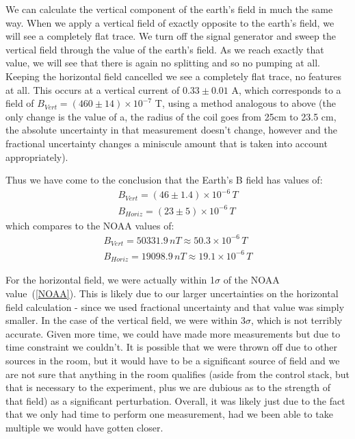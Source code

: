 \documentclass{article}
\begin{document}
    We can calculate the vertical component of the earth's field in much the same way.  When we apply a vertical field of exactly opposite to the earth's field, we will see a completely flat trace.  We turn off the signal generator and sweep the vertical field through the value of the earth's field.  As we reach exactly that value, we will see that there is again no splitting and so no pumping at all.  Keeping the horizontal field cancelled we see a completely flat trace, no features at all.  This occurs at a vertical current of $0.33 \pm 0.01$ A, which corresponds to a field of $B_{Vert} = (460 \pm 14) \times 10^{-7}$ T, using a method analogous to above (the only change is the value of a, the radius of the coil goes from 25cm to 23.5 cm, the absolute uncertainty in that measurement doesn't change, however and the fractional uncertainty changes a miniscule amount that is taken into account appropriately).

    \hspace{.25cm}

    Thus we have come to the conclusion that the Earth's B field has values of:
    \begin{gather*}
      B_{Vert} = (46 \pm 1.4) \times 10^{-6} \, T \\
      B_{Horiz} = (23 \pm 5) \times 10^{-6} \, T
    \end{gather*}
    which compares to the NOAA \cite{NOAA} values of:
    \begin{gather}
      B_{Vert} = 50331.9 \, nT \approx 50.3 \times 10^{-6} \, T \\
      B_{Horiz} = 19098.9 \, nT \approx 19.1 \times 10^{-6} \, T
      \label{NOAA}
    \end{gather}

    For the horizontal field, we were actually within 1$\sigma$ of the NOAA value~(\ref{NOAA}).  This is likely due to our larger uncertainties on the horizontal field calculation - since we used fractional uncertainty and that value was simply smaller.  In the case of the vertical field, we were within 3$\sigma$, which is not terribly accurate.  Given more time, we could have made more measurements but due to time constraint we couldn't.  It is possible that we were thrown off due to other sources in the room, but it would have to be a significant source of field and we are not sure that anything in the room qualifies (aside from the control stack, but that is necessary to the experiment, plus we are dubious as to the strength of that field) as a significant perturbation.  Overall, it was likely just due to the fact that we only had time to perform one measurement, had we been able to take multiple we would have gotten closer.
\end{document}
